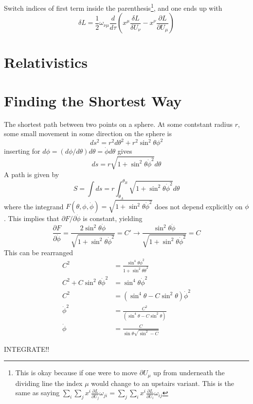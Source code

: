 \documentclass[11pt]{amsart}
\begin{document}
Switch indices of first term inside the parenthesis\footnote{This is okay because if one were to move $\partial U_\mu$ up from underneath the dividing line the index $\mu$ would change to an upstairs variant. This is the same as saying $\sum_i \sum_j x^i\frac{\partial L}{\partial U_j}\omega_{ji} = \sum_j \sum_i x^i\frac{\partial L}{\partial U_i}\omega_{ij}$}, and one ends up with
\begin{equation}
\delta L = \frac{1}{2}\omega_{\nu\mu} \frac{d}{d\tau}\left(x^\mu\frac{\delta L}{\delta U_\nu} - x^\nu\frac{\partial L}{\partial U_\mu} \right)
\end{equation}

\section{Relativistics}

\section{Finding the Shortest Way}
The shortest path between two points on a sphere. At some contstant radius $r$, some small movement in some direction on the sphere is
\begin{equation}
ds^2 = r^2d\theta^2 + r^2\sin^2\theta\phi^2 
\end{equation}
inserting for $d\phi = (d\phi/d\theta)d\theta = \dot{\phi}d\theta$ gives
\begin{equation}
ds = r\sqrt{1 +\sin^2\theta\dot{\phi}^2}d\theta
\end{equation}
A path is given by
\begin{equation}
S = \int ds = r \int_{\theta_A}^{\theta_B} \sqrt{1 + \sin^2\theta\dot{\phi}^2}d\theta
\end{equation}
where the integrand $F(\theta, \phi, \dot{\phi}) = \sqrt{1 + \sin^2\theta\dot{\phi}^2}$ does not depend explicitly on $\phi$. This implies that $\partial F/ \partial \dot{\phi}$ is constant, yielding
\begin{equation}
\frac{\partial F}{\partial \dot{\phi}} = \frac{2\sin^2\theta\dot{\phi}}{\sqrt{1 + \sin^2\theta\dot{\phi}^2}} = C' \rightarrow \frac{\sin^2\theta\dot{\phi}}{\sqrt{1 + \sin^2\theta\dot{\phi}^2}} = C  
\end{equation}
This can be rearranged
\begin{align*}
C^2 &= \frac{\sin^4\theta\dot{\phi}^2}{1 + \sin^2\theta\dot{\theta}^2} \\
C^2 + C\sin^2\theta\dot{\phi}^2 &= \sin^4\theta\dot{\phi}^2 \\
C^2 &= (\sin^4\theta - C\sin^2\theta)\dot{\phi}^2 \\
\dot{\phi}^2 &= \frac{C^2}{(\sin^4\theta - C\sin^2\theta)} \\
\dot{\phi} &= \frac{C}{\sin\theta\sqrt{\sin^2 - C}}
\end{align*}

INTEGRATE!!
\end{document}
